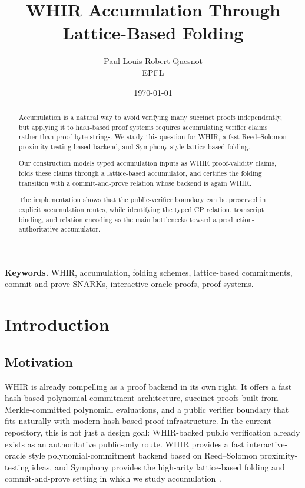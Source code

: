 \documentclass[11pt]{article}
\title{\Large \bf WHIR Accumulation Through Lattice-Based Folding}
\author{
Paul Louis Robert Quesnot\\
EPFL
}
\date{\today}
\theoremstyle{definition}
\begin{document}

\maketitle

\begin{abstract}
Accumulation is a natural way to avoid verifying many succinct proofs independently, but
applying it to hash-based proof systems requires accumulating verifier claims rather than
proof byte strings. We study this question for WHIR, a fast Reed--Solomon
proximity-testing based backend, and Symphony-style lattice-based folding.

Our construction models typed accumulation inputs as WHIR proof-validity claims,
folds these claims through a lattice-based accumulator, and certifies the folding
transition with a commit-and-prove relation whose backend is again WHIR.

The implementation shows that the public-verifier boundary can be preserved in explicit
accumulation routes, while identifying the typed CP relation, transcript binding, and relation
encoding as the main bottlenecks toward a production-authoritative accumulator.
 \end{abstract}

\vspace{1em}

\noindent\textbf{Keywords.}
WHIR, accumulation, folding schemes, lattice-based commitments, commit-and-prove SNARKs,
interactive oracle proofs, proof systems.

\newpage

\tableofcontents

\newpage

\section{Introduction}
\label{sec:introduction}

\subsection{Motivation}
\label{sec:motivation}
WHIR is already compelling as a proof backend in its own right. It offers a fast
hash-based polynomial-commitment architecture, succinct proofs built from
Merkle-committed polynomial evaluations, and a public verifier boundary that fits
naturally with modern hash-based proof infrastructure. In the current repository,
this is not just a design goal: WHIR-backed public verification already exists as
an authoritative public-only route. WHIR provides a fast interactive-oracle style
polynomial-commitment backend based on Reed--Solomon proximity-testing ideas,
and Symphony provides the high-arity lattice-based folding and commit-and-prove
setting in which we study accumulation~\cite{WHIR,Symphony}.
\end{document}
